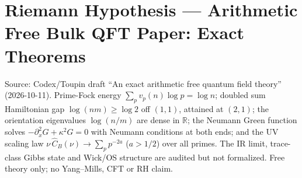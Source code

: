 \documentclass{report}
\theoremstyle{definition}
\begin{document}
\section{Riemann Hypothesis --- Arithmetic Free Bulk QFT Paper: Exact Theorems}
Source: Codex/Toupin draft ``An exact arithmetic free quantum field theory'' (2026-10-11). Prime-Fock energy $\sum_pv_p(n)\log p=\log n$; doubled sum Hamiltonian gap $\log(nm)\ge\log2$ off $(1,1)$, attained at $(2,1)$; the orientation eigenvalues $\log(n/m)$ are dense in $\mathbb R$; the Neumann Green function solves $-\partial_x^2G+\kappa^2G=0$ with Neumann conditions at both ends; and the UV scaling law $\nu\,\widehat C_B(\nu)\to\sum_pp^{-2a}$ ($a>1/2$) over all primes. The IR limit, trace-class Gibbs state and Wick/OS structure are audited but not formalized. Free theory only; no Yang--Mills, CFT or RH claim.
\end{document}
